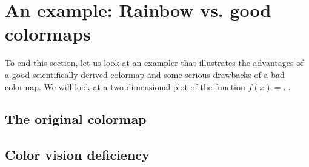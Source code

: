 \section{An example: Rainbow vs. good colormaps}\label{sec:rainbow}

To end this section, let us look at an exampler that illustrates the advantages of a good scientifically derived colormap and some serious drawbacks of a bad colormap. We will look at a two-dimensional plot of the function $f(x)= \ldots$



\subsection{The original colormap}
\subsection{Color vision deficiency}


% 	


% 	


% 	

% 	






